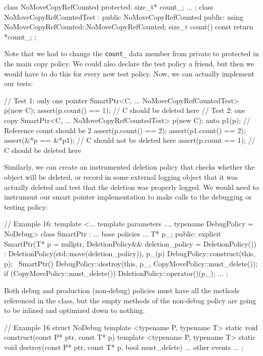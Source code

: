 \begin{code}
class NoMoveCopyRefCounted {
  protected:
  size_t* count_;
  ...
};
class NoMoveCopyRefCountedTest :
  public NoMoveCopyRefCounted {
  public:
  using NoMoveCopyRefCounted::NoMoveCopyRefCounted;
  size_t count() const { return *count_; }
};
\end{code}

Note that we had to change the \texttt{count\_} data member from private to protected in the main copy policy. We could also declare the test policy a friend, but then we would have to do this for every new test policy. Now, we can actually implement our tests:

\begin{code}
// Test 1: only one pointer
{
  SmartPtr<C, ... NoMoveCopyRefCountedTest> p(new C);
  assert(p.count() == 1);
} // C should be deleted here
// Test 2: one copy
{
  SmartPtr<C, ... NoMoveCopyRefCountedTest> p(new C);
  {
  auto p1(p); // Reference count should be 2
    assert(p.count() == 2);
    assert(p1.count() == 2);
    assert(&*p == &*p1);
  } // C should not be deleted here
  assert(p.count == 1);
} // C should be deleted here
\end{code}

Similarly, we can create an instrumented deletion policy that checks whether the object will be deleted, or record in some external logging object that it was actually deleted and test that the deletion was properly logged. We would need to instrument our smart pointer implementation to make calls to the debugging or testing policy:

\begin{code}
// Example 16:
template <... template parameters ...,
          typename DebugPolicy = NoDebug>
class SmartPtr : ... base policies ... {
  T* p_;
  public:
  explicit SmartPtr(T* p = nullptr,
    DeletionPolicy&& deletion_policy = DeletionPolicy()) :
    DeletionPolicy(std::move(deletion_policy)), p_(p)
  {
    DebugPolicy::construct(this, p);
  }
  ~SmartPtr() {
    DebugPolicy::destroy(this, p_,
                         CopyMovePolicy::must_delete());
  if (CopyMovePolicy::must_delete())
    DeletionPolicy::operator()(p_);
  }
  ...
};
\end{code}

Both debug and production (non-debug) policies must have all the methods referenced in the class, but the empty methods of the non-debug policy are going to be inlined and optimized down to nothing.

\begin{code}
// Example 16
struct NoDebug {
  template <typename P, typename T>
  static void construct(const P* ptr, const T* p) {}
  template <typename P, typename T>
  static void destroy(const P* ptr, const T* p,
                      bool must_delete) {}
  ... other events ...
};
\end{code}

